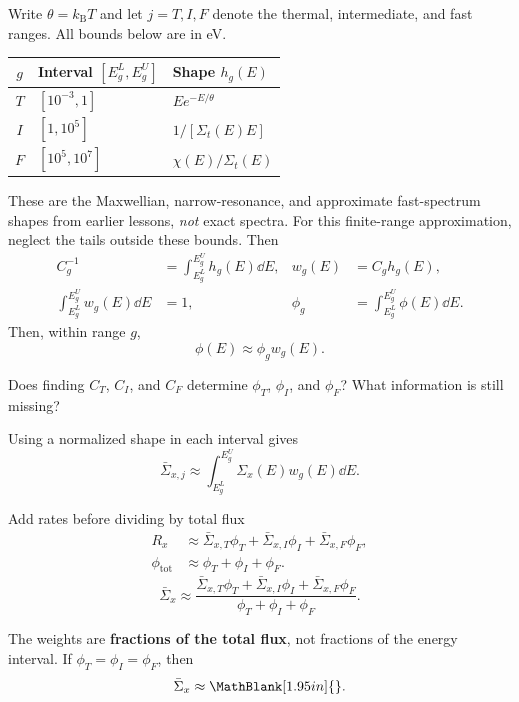 \begin{handoutcolumns}
\switchcolumn
\RaggedRight
{}
Write $\theta=k_{\mathrm B}T$ and let $j=T,I,F$ denote the
thermal, intermediate, and fast ranges. All bounds below are in eV.
\begin{center}
\renewcommand{\arraystretch}{1.5}
\begin{tabular}{@{}cll@{}}
\toprule
$g$ &  Interval $[E^{L}_g, E^{U}_g]$ & Shape $h_g(E)$\\
\midrule
$T$ & $[10^{-3},1]$ & $E e^{-E/\theta}$\\
$I$ & $[1,10^5]$ & $1/[\Sigma_t(E)E]$\\
$F$ & $[10^5,10^7]$ & $\chi(E)/\Sigma_t(E)$\\
\bottomrule
\end{tabular}
\end{center}
These are the Maxwellian, narrow-resonance, and approximate
fast-spectrum shapes from earlier lessons, \emph{not} exact spectra.
For this finite-range approximation, neglect the tails outside these bounds.  Then
\begin{align*}
 C_g^{-1}&=\int_{E^{L}_g}^{E^{U}_g}h_g(E)\dd E, &
 w_g(E)&=C_gh_g(E),\\
 \int_{E^{L}_g}^{E^{U}_g}w_g(E)\dd E&=1, &
 \phi_g&=\int_{E^{L}_g}^{E^{U}_g}\phi(E)\dd E.
\end{align*}
Then, within range $g$,
\[
 \boxed{\phi(E)\approx\phi_g w_g(E)}.
\]
\begin{checkpoint}
Does finding $C_T$, $C_I$, and $C_F$ determine
$\phi_T$, $\phi_I$, and $\phi_F$? What information is still missing?
\end{checkpoint}

Using a normalized shape in each interval gives
\[
 \bar\Sigma_{x,j}\approx
 \int_{E^{L}_g}^{E^{U}_g}\Sigma_x(E)w_g(E)\dd E.
\]
\begin{boardbox}{Add rates before dividing by total flux}
\begin{align*}
 R_x&\approx\bar\Sigma_{x,T}\phi_T
       +\bar\Sigma_{x,I}\phi_I+\bar\Sigma_{x,F}\phi_F,\\
 \phi_{\mathrm{tot}}&\approx\phi_T+\phi_I+\phi_F.
\end{align*}
\[
 \boxed{\bar\Sigma_x\approx
 \frac{\bar\Sigma_{x,T}\phi_T+\bar\Sigma_{x,I}\phi_I
       +\bar\Sigma_{x,F}\phi_F}{\phi_T+\phi_I+\phi_F}}.
\]
\end{boardbox}
The weights are \textbf{fractions of the total flux}, not fractions
of the energy interval. If $\phi_T=\phi_I=\phi_F$, then
\[
 \bar\Sigma_x\approx\MathBlank[1.95in]{}.
\]
\end{handoutcolumns}

